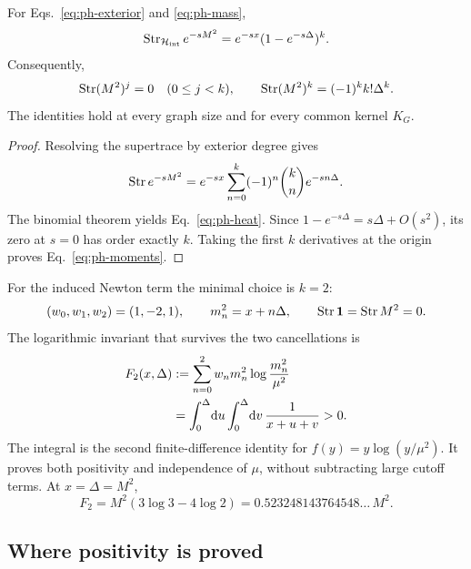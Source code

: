 \begin{theorem}
\label{thm:ph-balance}
For Eqs.~\eqref{eq:ph-exterior} and \eqref{eq:ph-mass},
\begin{equation}
 \operatorname{Str}_{\mathcal H_{\rm int}}e^{-sM^2}
 =e^{-sx}(1-e^{-s\Delta})^k .
 \label{eq:ph-heat}
\end{equation}
Consequently,
\begin{equation}
 \operatorname{Str}(M^2)^j=0\quad(0\leq j<k),\qquad
 \operatorname{Str}(M^2)^k=(-1)^k k!\Delta^k .
 \label{eq:ph-moments}
\end{equation}
The identities hold at every graph size and for every common kernel
\(K_G\).
\end{theorem}

\begin{proof}
Resolving the supertrace by exterior degree gives
\[
 \operatorname{Str} e^{-sM^2}
 =e^{-sx}\sum_{n=0}^{k}(-1)^n\binom{k}{n}e^{-sn\Delta}.
\]
The binomial theorem yields Eq.~\eqref{eq:ph-heat}.  Since
\(1-e^{-s\Delta}=s\Delta+O(s^2)\), its zero at \(s=0\) has order exactly
\(k\).  Taking the first \(k\) derivatives at the origin proves
Eq.~\eqref{eq:ph-moments}.
\end{proof}

For the induced Newton term the minimal choice is \(k=2\):
\begin{equation}
 (w_0,w_1,w_2)=(1,-2,1),\qquad
 m_n^2=x+n\Delta,\qquad
 \operatorname{Str}\mathbf 1=\operatorname{Str} M^2=0 .
 \label{eq:ph-k2}
\end{equation}
The logarithmic invariant that survives the two cancellations is
\begin{align}
 F_2(x,\Delta)
 &:=\sum_{n=0}^{2}w_n m_n^2
          \log\frac{m_n^2}{\mu^2}\nonumber\\
 &=\int_0^\Delta\!\mathrm d u\int_0^\Delta\!\mathrm d v\,
     \frac{1}{x+u+v}>0 .
 \label{eq:ph-positive-invariant}
\end{align}
The integral is the second finite-difference identity for
\(f(y)=y\log(y/\mu^2)\).  It proves both positivity and independence of
\(\mu\), without subtracting large cutoff terms.  At \(x=\Delta=M^2\),
\begin{equation}
 F_2=M^2(3\log3-4\log2)
 =0.523248143764548\ldots\,M^2 .
 \label{eq:ph-value}
\end{equation}

\subsection{Where positivity is proved}

